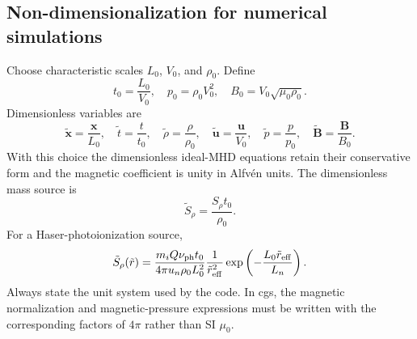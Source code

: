 \documentclass[11pt,a4paper]{article}
\newcommand{\uvec}{\boldsymbol{u}}
\newcommand{\Bvec}{\boldsymbol{B}}
\newcommand{\rhov}{\rho}
\begin{document}
\subsection{Non-dimensionalization for numerical simulations}
Choose characteristic scales $L_0$, $V_0$, and $\rhov_0$. Define
\begin{equation}
t_0=\frac{L_0}{V_0},\quad
p_0=\rhov_0V_0^2,\quad
B_0=V_0\sqrt{\mu_0\rhov_0}.
\label{eq:normalization}
\end{equation}
Dimensionless variables are
\begin{equation}
\tilde{\boldsymbol x}=\frac{\boldsymbol x}{L_0},\quad
\tilde t=\frac{t}{t_0},\quad
\tilde\rhov=\frac{\rhov}{\rhov_0},\quad
\tilde{\uvec}=\frac{\uvec}{V_0},\quad
\tilde p=\frac{p}{p_0},\quad
\tilde{\Bvec}=\frac{\Bvec}{B_0}.
\end{equation}
With this choice the dimensionless ideal-MHD equations retain their conservative form and the magnetic coefficient is unity in Alfv\'en units. The dimensionless mass source is
\begin{equation}
\tilde S_\rho=\frac{S_\rho t_0}{\rhov_0}.
\label{eq:dimensionless-source}
\end{equation}
For a Haser-photoionization source,
\begin{equation}
\tilde S_\rho(\tilde r)=
\frac{m_iQ\nu_{\rm ph}t_0}{4\pi u_n\rhov_0L_0^2}
\frac{1}{\tilde r_{\rm eff}^2}
\exp\left(-\frac{L_0\tilde r_{\rm eff}}{L_n}\right).
\end{equation}
Always state the unit system used by the code. In cgs, the magnetic normalization and magnetic-pressure expressions must be written with the corresponding factors of $4\pi$ rather than SI $\mu_0$.
\end{document}
